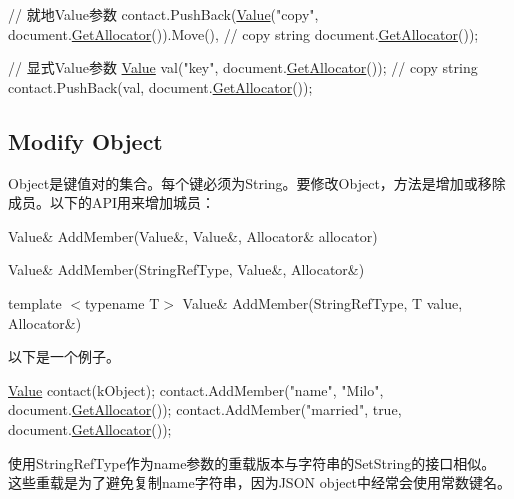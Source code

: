 \begin{DoxyCode}
\textcolor{comment}{// 就地Value参数}
contact.PushBack(\hyperlink{document_8h_a071cf97155ba72ac9a1fc4ad7e63d481}{Value}(\textcolor{stringliteral}{"copy"}, document.\hyperlink{class_generic_document_aa4609d6b19f86aec1a6b96edf2c27686}{GetAllocator}()).Move(), \textcolor{comment}{// copy string}
                 document.\hyperlink{class_generic_document_aa4609d6b19f86aec1a6b96edf2c27686}{GetAllocator}());

\textcolor{comment}{// 显式Value参数}
\hyperlink{class_generic_value}{Value} val(\textcolor{stringliteral}{"key"}, document.\hyperlink{class_generic_document_aa4609d6b19f86aec1a6b96edf2c27686}{GetAllocator}()); \textcolor{comment}{// copy string}
contact.PushBack(val, document.\hyperlink{class_generic_document_aa4609d6b19f86aec1a6b96edf2c27686}{GetAllocator}());
\end{DoxyCode}
\hypertarget{md_Commun_Externe_RapidJSON_doc_tutorial.zh-cn_ModifyObject}{}\subsection{Modify Object}\label{md_Commun_Externe_RapidJSON_doc_tutorial.zh-cn_ModifyObject}
Object是键值对的集合。每个键必须为\+String。要修改\+Object，方法是增加或移除成员。以下的\+A\+P\+I用来增加城员：


\begin{DoxyItemize}
\item {\ttfamily Value\& Add\+Member(\+Value\&, Value\&, Allocator\& allocator)}
\item {\ttfamily Value\& Add\+Member(\+String\+Ref\+Type, Value\&, Allocator\&)}
\item {\ttfamily template $<$typename T$>$ Value\& Add\+Member(\+String\+Ref\+Type, T value, Allocator\&)}
\end{DoxyItemize}

以下是一个例子。


\begin{DoxyCode}
\hyperlink{class_generic_value}{Value} contact(kObject);
contact.AddMember(\textcolor{stringliteral}{"name"}, \textcolor{stringliteral}{"Milo"}, document.\hyperlink{class_generic_document_aa4609d6b19f86aec1a6b96edf2c27686}{GetAllocator}());
contact.AddMember(\textcolor{stringliteral}{"married"}, \textcolor{keyword}{true}, document.\hyperlink{class_generic_document_aa4609d6b19f86aec1a6b96edf2c27686}{GetAllocator}());
\end{DoxyCode}


使用{\ttfamily String\+Ref\+Type}作为name参数的重载版本与字符串的{\ttfamily Set\+String}的接口相似。 这些重载是为了避免复制{\ttfamily name}字符串，因为\+J\+S\+ON object中经常会使用常数键名。

